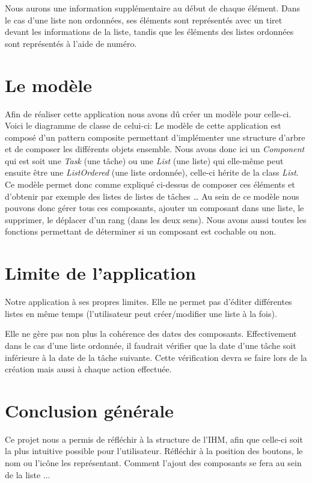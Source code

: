 \documentclass[a4paper,10pt]{article}
\begin{document}
Nous aurons une information supplémentaire au début de chaque élément. Dans le cas d'une liste non ordonnées, ses éléments sont représentés avec un tiret devant les informations de la liste, tandis que les éléments des listes ordonnées sont représentés à l'aide de numéro.

\newpage
\section{Le modèle}
Afin de réaliser cette application nous avons dû créer un modèle pour celle-ci. Voici le diagramme de classe de celui-ci:
Le modèle de cette application est composé d'un pattern composite permettant d'implémenter une structure d'arbre et de composer les différents objets ensemble. Nous avons donc ici un \textit{Component} qui est soit une \textit{Task} (une tâche) ou une \textit{List} (une liste) qui elle-même peut ensuite être une \textit{ListOrdered} (une liste ordonnée), celle-ci hérite de la class \textit{List}. Ce modèle permet donc comme expliqué ci-dessus de composer ces éléments et d'obtenir par exemple des listes de listes de tâches \dots 
Au sein de ce modèle nous pouvons donc gérer tous ces composants, ajouter un composant dans une liste, le supprimer, le déplacer d'un rang (dans les deux sens). Nous avons aussi toutes les fonctions permettant de déterminer si un composant est cochable ou non.

\newpage
\section{Limite de l'application}
Notre application à ses propres limites. Elle ne permet pas d'éditer différentes listes en même temps (l'utilisateur peut créer/modifier une liste à la fois).

Elle ne gère pas non plus la cohérence des dates des composants. Effectivement dans le cas d'une liste ordonnée, il faudrait vérifier que la date d'une tâche
soit inférieure à la date de la tâche suivante. Cette vérification devra se faire lors de la création mais aussi à chaque action effectuée.

\newpage
\section{Conclusion générale}
Ce projet nous a permis de réfléchir à la structure de l'IHM, afin que celle-ci soit la plus intuitive possible pour l'utilisateur. Réfléchir à la position des
boutons, le nom ou l'icône les représentant. Comment l'ajout des composants se fera au sein de la liste ...
\end{document}
